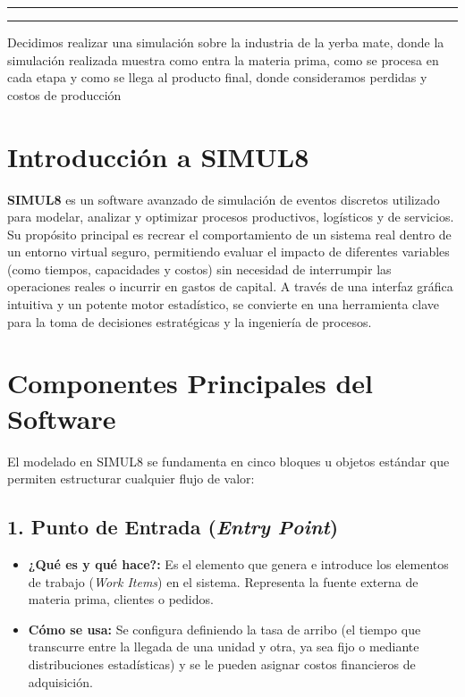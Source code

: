 \documentclass[11pt, a4paper]{article}
\begin{document}
\newpage

\begin{keepfromtoc}
    \tableofcontents
\end{keepfromtoc}

\vspace{0.5cm}
\hrule
\newpage %



\hrule
\vspace{0.5cm}

Decidimos realizar una simulación sobre la industria de la yerba mate, donde la simulación realizada muestra como entra la materia prima, como se procesa en cada etapa y como se llega al producto final, donde consideramos perdidas y costos de producción 

\section{Introducción a SIMUL8}

\textbf{SIMUL8} es un software avanzado de simulación de eventos discretos utilizado para modelar, analizar y optimizar procesos productivos, logísticos y de servicios. Su propósito principal es recrear el comportamiento de un sistema real dentro de un entorno virtual seguro, permitiendo evaluar el impacto de diferentes variables (como tiempos, capacidades y costos) sin necesidad de interrumpir las operaciones reales o incurrir en gastos de capital. A través de una interfaz gráfica intuitiva y un potente motor estadístico, se convierte en una herramienta clave para la toma de decisiones estratégicas y la ingeniería de procesos.

\section{Componentes Principales del Software}

El modelado en SIMUL8 se fundamenta en cinco bloques u objetos estándar que permiten estructurar cualquier flujo de valor:

\subsection{1. Punto de Entrada (\textit{Entry Point})}
\begin{itemize}
    \item \textbf{¿Qué es y qué hace?:} Es el elemento que genera e introduce los elementos de trabajo (\textit{Work Items}) en el sistema. Representa la fuente externa de materia prima, clientes o pedidos.
    \item \textbf{Cómo se usa:} Se configura definiendo la tasa de arribo (el tiempo que transcurre entre la llegada de una unidad y otra, ya sea fijo o mediante distribuciones estadísticas) y se le pueden asignar costos financieros de adquisición.
\end{itemize}
\end{document}
